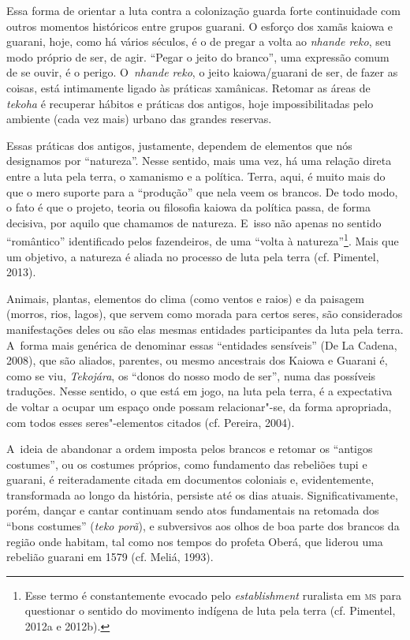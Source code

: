 Essa forma de orientar a luta contra a colonização guarda forte
continuidade com outros momentos históricos entre grupos guarani. O
esforço dos xamãs kaiowa e guarani, hoje, como há vários séculos, é o
de pregar a volta ao \emph{nhande reko}, seu modo próprio de ser, de agir.
``Pegar o jeito do branco'', uma expressão comum de se ouvir, é o perigo.
O~\emph{nhande reko}, o jeito kaiowa/guarani de ser, de fazer as coisas, está
intimamente ligado às práticas xamânicas. Retomar as áreas de \emph{tekoha} é
recuperar hábitos e práticas dos antigos, hoje impossibilitadas pelo
ambiente (cada vez mais) urbano das grandes reservas.

Essas práticas dos antigos, justamente, dependem de elementos que nós
designamos por ``natureza''. Nesse sentido, mais uma vez, há uma relação
direta entre a luta pela terra, o xamanismo e a política. Terra, aqui,
é muito mais do que o mero suporte para a ``produção'' que nela veem os
brancos. De todo modo, o fato é que o projeto, teoria ou filosofia
kaiowa da política passa, de forma decisiva, por aquilo que chamamos de
natureza. E~isso não apenas no sentido ``romântico'' identificado pelos
fazendeiros, de uma ``volta à natureza''\footnote{Esse termo é
constantemente evocado pelo \emph{establishment} ruralista em \textsc{ms} para
questionar o sentido do movimento indígena de luta pela terra (cf.
Pimentel, 2012a e 2012b).}. Mais que um objetivo, a natureza é aliada
no processo de luta pela terra (cf. Pimentel, 2013).

Animais, plantas, elementos do clima (como ventos e raios) e da paisagem
(morros, rios, lagos), que servem como morada para certos seres, são
considerados manifestações deles ou são elas mesmas entidades
participantes da luta pela terra. A~forma mais genérica de denominar
essas ``entidades sensíveis'' (De La Cadena, 2008), que são aliados,
parentes, ou mesmo ancestrais dos Kaiowa e Guarani é, como se viu,
\emph{Tekojára}, os ``donos do nosso modo de ser'', numa das possíveis
traduções. Nesse sentido, o que está em jogo, na luta pela terra, é a
expectativa de voltar a ocupar um espaço onde possam relacionar"-se, da
forma apropriada, com todos esses seres"-elementos citados (cf. Pereira,
2004).

A~ideia de abandonar a ordem imposta pelos brancos e retomar os ``antigos
costumes'', ou os costumes próprios, como fundamento das rebeliões tupi
e guarani, é reiteradamente citada em documentos coloniais e,
evidentemente, transformada ao longo da história, persiste até os dias
atuais. Significativamente, porém, dançar e cantar continuam sendo atos
fundamentais na retomada dos ``bons costumes'' (\emph{teko porã}), e subversivos
aos olhos de boa parte dos brancos da região onde habitam, tal como nos
tempos do profeta Oberá, que liderou uma rebelião guarani em 1579 (cf.
Meliá, 1993).

